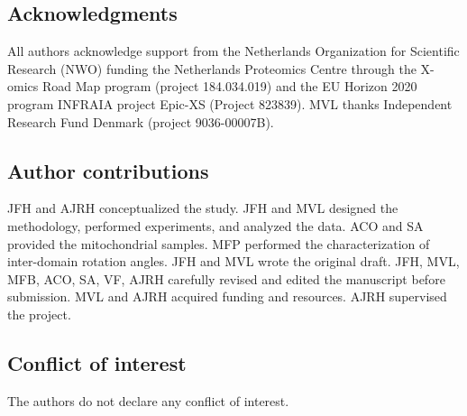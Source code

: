 \subsection*{Acknowledgments}
All authors acknowledge support from the Netherlands Organization for Scientific Research (NWO) funding the Netherlands Proteomics Centre through the X-omics Road Map program (project 184.034.019) and the EU Horizon 2020 program INFRAIA project Epic-XS (Project 823839). MVL thanks Independent Research Fund Denmark (project 9036-00007B). 

\subsection*{Author contributions}
JFH and AJRH conceptualized the study. JFH and MVL designed the methodology, performed experiments, and analyzed the data. ACO and SA provided the mitochondrial samples. MFP performed the characterization of inter-domain rotation angles. JFH and MVL wrote the original draft. JFH, MVL, MFB, ACO, SA, VF, AJRH carefully revised and edited the manuscript before submission. MVL and AJRH acquired funding and resources. AJRH supervised the project.

\subsection*{Conflict of interest}
The authors do not declare any conflict of interest.

